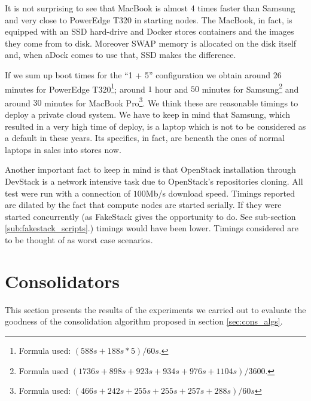 It is not surprising to see that MacBook is almost 4 times faster than Samsung and very close to PowerEdge T320 in starting nodes. The MacBook, in fact, is equipped with an SSD hard-drive and Docker stores containers and the images they come from to disk. Moreover SWAP memory is allocated on the disk itself and, when aDock comes to use that, SSD makes the difference.

If we sum up boot times for the ``1 + 5'' configuration we obtain around $26$ minutes for PowerEdge T320\footnote{Formula used: $(588s + 188s * 5) / 60s$.}; around $1$ hour and $50$ minutes for Samsung\footnote{Formula used $(1736s + 898s + 923s + 934s + 976s + 1104s) / 3600$.} and around $30$ minutes for MacBook Pro\footnote{Formula used: $(466s + 242s + 255s + 255s + 257s + 288s) / 60s$}. We think these are reasonable timings to deploy a private cloud system. We have to keep in mind that Samsung, which resulted in a very high time of deploy, is a laptop which is not to be considered as a default in these years. Its specifics, in fact, are beneath the ones of normal laptops in sales into stores now.

Another important fact to keep in mind is that OpenStack installation through DevStack is a network intensive task due to OpenStack's repositories cloning. All test were run with a connection of $100$Mb/s download speed.
Timings reported are dilated by the fact that compute nodes are started serially. If they were started concurrently (as FakeStack gives the opportunity to do. See sub-section \ref{sub:fakestack_scripts}.) timings would have been lower. Timings considered are to be thought of as worst case scenarios.

\section{Consolidators}
\label{sec:eval_cons}
\newcommand{\allownewline}[2][c]{\begin{tabular}[#1]{@{}c@{}}#2\end{tabular}}

This section presents the results of the experiments we carried out to evaluate the goodness of the consolidation algorithm proposed in section \ref{sec:cons_algs}.

